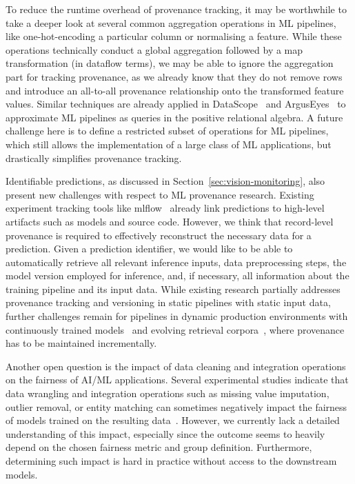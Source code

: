 To reduce the runtime overhead of provenance tracking, it may be worthwhile to take a deeper look at several common aggregation operations in ML pipelines, like one-hot-encoding a particular column or normalising a feature. While these operations technically conduct a global aggregation followed by a map transformation (in dataflow terms), we may be able to ignore the aggregation part for tracking provenance, as we already know that they do not remove rows and introduce an all-to-all provenance relationship onto the transformed feature values. Similar techniques are already applied in DataScope~\cite{karlavs2022data} and ArgusEyes~\cite{schelter2023proactively} to approximate ML pipelines as queries in the positive relational algebra. A future challenge here is to define a restricted subset of operations for ML pipelines, which still allows the implementation of a large class of ML applications, but drastically simplifies provenance tracking.


Identifiable predictions, as discussed in Section~\ref{sec:vision-monitoring}, also present new challenges with respect to ML provenance research. Existing experiment tracking tools like mlflow~\cite{zaharia2018accelerating} already link predictions to high-level artifacts such as models and source code. However, we think that record-level provenance is required to effectively reconstruct the necessary data for a prediction. Given a prediction identifier, we would like to be able to automatically retrieve all relevant inference inputs, data preprocessing steps, the model version employed for inference, and, if necessary, all information about the training pipeline and its input data. While existing research partially addresses provenance tracking and versioning in static pipelines with static input data, further challenges remain for pipelines in dynamic production environments with continuously trained models~\cite{baylor19tfxContinous} and evolving retrieval corpora~\cite{Guo16traditionalIR,chend23dynamicCorpora,bleifuss2018change}, where provenance has to be maintained incrementally.


Another open question is the impact of data cleaning and integration operations on the fairness of AI/ML applications. Several experimental studies indicate that data wrangling and integration operations such as missing value imputation, outlier removal, or entity matching can sometimes negatively impact the fairness of models trained on the resulting data~\cite{guha2023automated,li2021cleanml,tae2019data,shahbazi2023through}. However, we currently lack a detailed understanding of this impact, especially since the outcome seems to heavily depend on the chosen fairness metric and group definition. Furthermore, determining such impact is hard in practice without access to the downstream models.

